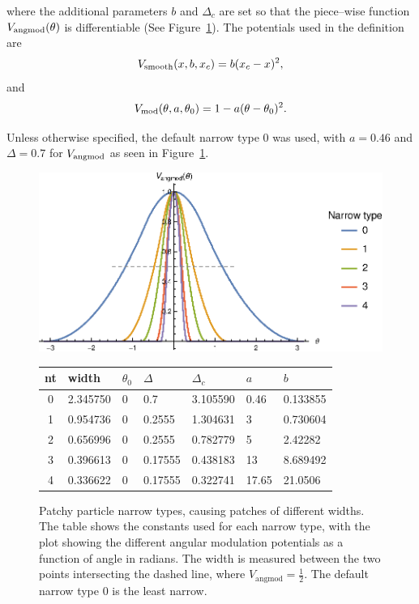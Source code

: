 where the additional parameters $b$ and $\Delta_c$ are set so that the piece--wise function $V_{\rm angmod}(\theta)$ is differentiable (See Figure~\ref{fig:narrow_types}). The potentials used in the definition are 
\begin{equation}
\label{eq:smooth}
V_{\rm smooth} (x, b, x_c) = b(x_c - x)^2, 
\end{equation}
and
\begin{equation}
V_{\rm mod} (\theta, a, \theta_0) = 1 - a (\theta-\theta_0)^2.
\end{equation}

Unless otherwise specified, the default narrow type 0 was used, with 
$a = 0.46$ and $\Delta = 0.7$ for $V_{\rm angmod}$ as seen in Figure~\ref{fig:narrow_types}.

\begin{figure}[h]
\includegraphics[width=\linewidth]{figures/patchysim/nts.eps}
\begin{tabular}{|c|l||l|l|l|l|l|}
    \hline
    nt & width & \(\theta_0\) & \(\Delta\) & \(\Delta_c\) & \(a\) & \(b\) \\ [0.5ex] 
    \hline\hline
    0 & 2.345750 & 0 & 0.7 & 3.105590 & 0.46 & 0.133855 \\
    1 & 0.954736 & 0 & 0.2555 & 1.304631 & 3 & 0.730604 \\
    2 & 0.656996 & 0 & 0.2555 & 0.782779 & 5 & 2.42282 \\
    3 & 0.396613 & 0 & 0.17555 & 0.438183 & 13 & 8.689492 \\
    4 & 0.336622 & 0 & 0.17555 & 0.322741 & 17.65 & 21.0506 \\
    \hline
\end{tabular}
\caption{Patchy particle narrow types, causing patches of different widths. The table shows the constants used for each narrow type, with the plot showing the different angular modulation potentials as a function of angle in radians. The width is measured between the two points intersecting the dashed line, where \(V_{\text{angmod}}=\frac{1}{2}\). The default narrow type \(0\) is the least narrow. }
\label{fig:narrow_types}
\end{figure}

